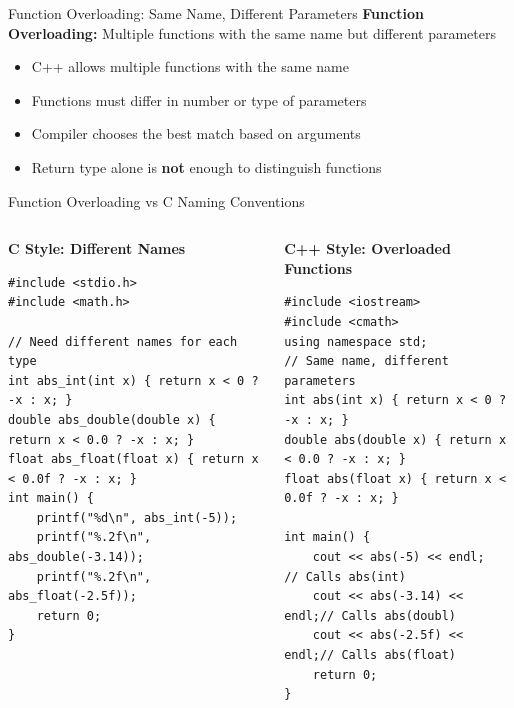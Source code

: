 \begin{frame}[fragile]{Function Overloading: Same Name, Different Parameters}
	\textbf{Function Overloading:} Multiple functions with the same name but different parameters

	\begin{itemize}
		\item C++ allows multiple functions with the same name
		\item Functions must differ in number or type of parameters
		\item Compiler chooses the best match based on arguments
		\item Return type alone is \textbf{not} enough to distinguish functions
	\end{itemize}
\end{frame}

\begin{frame}[fragile]{Function Overloading vs C Naming Conventions}
	\begin{columns}
		\begin{column}{0.5\textwidth}
			\textbf{C Style: Different Names}
			\begin{verbatim}
#include <stdio.h>
#include <math.h>

// Need different names for each type
int abs_int(int x) { return x < 0 ? -x : x; }
double abs_double(double x) { return x < 0.0 ? -x : x; }
float abs_float(float x) { return x < 0.0f ? -x : x; }
int main() {
    printf("%d\n", abs_int(-5));
    printf("%.2f\n", abs_double(-3.14));
    printf("%.2f\n", abs_float(-2.5f));
    return 0;
}
            \end{verbatim}
		\end{column}
		\begin{column}{0.5\textwidth}
			\textbf{C++ Style: Overloaded Functions}
			\begin{verbatim}
#include <iostream>
#include <cmath>
using namespace std;
// Same name, different parameters
int abs(int x) { return x < 0 ? -x : x; }
double abs(double x) { return x < 0.0 ? -x : x; }
float abs(float x) { return x < 0.0f ? -x : x; }

int main() {
    cout << abs(-5) << endl;   // Calls abs(int)
    cout << abs(-3.14) << endl;// Calls abs(doubl)
    cout << abs(-2.5f) << endl;// Calls abs(float)
    return 0;
}
            \end{verbatim}
		\end{column}
	\end{columns}
\end{frame}

